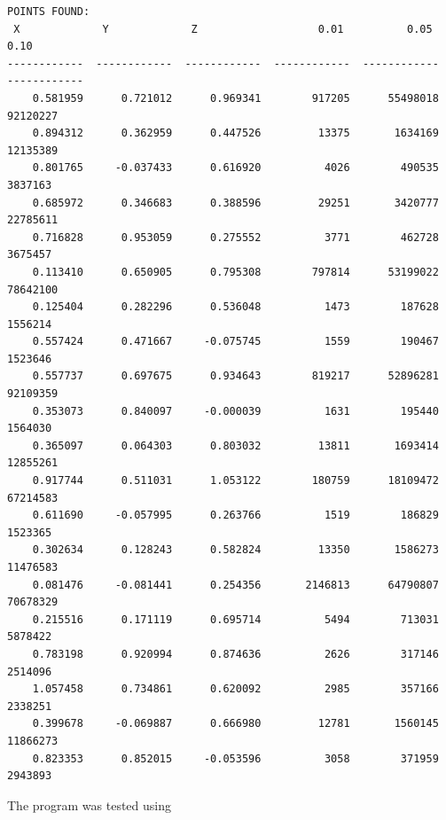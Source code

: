 \begin{minipage}{\linewidth}
\begin{verbatim}
POINTS FOUND:
 X             Y             Z                   0.01          0.05          0.10
------------  ------------  ------------  ------------  ------------  ------------
    0.581959      0.721012      0.969341        917205      55498018      92120227
    0.894312      0.362959      0.447526         13375       1634169      12135389
    0.801765     -0.037433      0.616920          4026        490535       3837163
    0.685972      0.346683      0.388596         29251       3420777      22785611
    0.716828      0.953059      0.275552          3771        462728       3675457
    0.113410      0.650905      0.795308        797814      53199022      78642100
    0.125404      0.282296      0.536048          1473        187628       1556214
    0.557424      0.471667     -0.075745          1559        190467       1523646
    0.557737      0.697675      0.934643        819217      52896281      92109359
    0.353073      0.840097     -0.000039          1631        195440       1564030
    0.365097      0.064303      0.803032         13811       1693414      12855261
    0.917744      0.511031      1.053122        180759      18109472      67214583
    0.611690     -0.057995      0.263766          1519        186829       1523365
    0.302634      0.128243      0.582824         13350       1586273      11476583
    0.081476     -0.081441      0.254356       2146813      64790807      70678329
    0.215516      0.171119      0.695714          5494        713031       5878422
    0.783198      0.920994      0.874636          2626        317146       2514096
    1.057458      0.734861      0.620092          2985        357166       2338251
    0.399678     -0.069887      0.666980         12781       1560145      11866273
    0.823353      0.852015     -0.053596          3058        371959       2943893
\end{verbatim}
\end{minipage}

The program was tested using 
